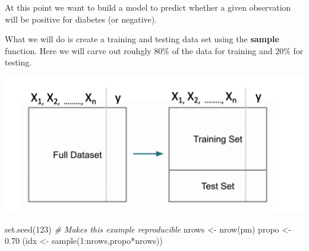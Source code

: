 \documentclass[
]{article}
\newenvironment{Shaded}{\begin{snugshade}}{\end{snugshade}}
\newcommand{\CommentTok}[1]{\textcolor[rgb]{0.56,0.35,0.01}{\textit{#1}}}
\newcommand{\DecValTok}[1]{\textcolor[rgb]{0.00,0.00,0.81}{#1}}
\newcommand{\FloatTok}[1]{\textcolor[rgb]{0.00,0.00,0.81}{#1}}
\newcommand{\FunctionTok}[1]{\textcolor[rgb]{0.00,0.00,0.00}{#1}}
\newcommand{\NormalTok}[1]{#1}
\newcommand{\OtherTok}[1]{\textcolor[rgb]{0.56,0.35,0.01}{#1}}
\newcommand{\SpecialCharTok}[1]{\textcolor[rgb]{0.00,0.00,0.00}{#1}}
\begin{document}
At this point we want to build a model to predict whether a given
observation will be positive for diabetes (or negative).

What we will do is create a training and testing data set using the
\textbf{sample} function. Here we will carve out rouhgly 80\% of the
data for training and 20\% for testing.

\includegraphics{./IMG/split.png}

\begin{Shaded}
\begin{Highlighting}[]
\FunctionTok{set.seed}\NormalTok{(}\DecValTok{123}\NormalTok{)  }\CommentTok{\# Makes this example reproducible}
\NormalTok{nrows }\OtherTok{\textless{}{-}} \FunctionTok{nrow}\NormalTok{(pm)}
\NormalTok{propo }\OtherTok{\textless{}{-}} \FloatTok{0.70}
\NormalTok{(idx }\OtherTok{\textless{}{-}} \FunctionTok{sample}\NormalTok{(}\DecValTok{1}\SpecialCharTok{:}\NormalTok{nrows,propo}\SpecialCharTok{*}\NormalTok{nrows))}
\end{Highlighting}
\end{Shaded}
\end{document}
